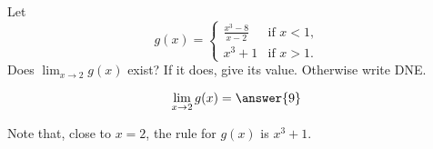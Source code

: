 \documentclass{ximera}
\author{Steven Gubkin}
\begin{document}
\begin{exercise}

Let
\[
g(x) = \begin{cases}
  \frac{x^3 - 8}{x-2}  &\text{if $x<1$,} \\
  x^3+1 &\text{if  $x>1$.}
\end{cases}
\]
Does $\lim_{x \to 2} g(x)$ exist?  If it does, give its value.
Otherwise write DNE.
\begin{prompt}
\[
\lim_{x \to 2} g(x) = \answer{9}
\]
\end{prompt}
\begin{hint}
	Note that, close to $x=2$, the rule for $g(x)$ is $x^3+1$.
\end{hint}

\end{exercise}
\end{document}

